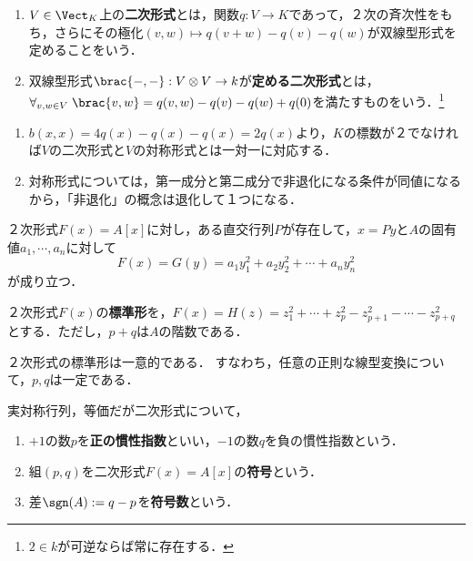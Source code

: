 \documentclass[uplatex, dvipdfmx]{jsreport}
\begin{document}
\begin{definition}\mbox{}
    \begin{enumerate}
        \item $V\in\Vect_K$上の\textbf{二次形式}とは，関数$q:V\to K$であって，２次の斉次性をもち，さらにその極化$(v,w)\mapsto q(v+w)-q(v)-q(w)$が双線型形式を定めることをいう．
        \item 双線型形式$\brac{-,-}:V\otimes V\to k$が\textbf{定める二次形式}とは，$\forall_{v,w\in V}\;\brac{v,w}=q(v,w)-q(v)-q(w)+q(0)$を満たすものをいう．\footnote{$2\in k$が可逆ならば常に存在する．}
    \end{enumerate}
\end{definition}
\begin{remark}[二次形式と双線型形式の一対一対応]\mbox{}
    \begin{enumerate}
        \item $b(x,x)=4q(x)-q(x)-q(x)=2q(x)$より，$K$の標数が２でなければ$V$の二次形式と$V$の対称形式とは一対一に対応する．
        \item 対称形式については，第一成分と第二成分で非退化になる条件が同値になるから，「非退化」の概念は退化して１つになる．
    \end{enumerate}
\end{remark}


\begin{theorem}[対称行列の対角化の二次形式の言葉による消息]
    ２次形式$F(x)=A[x]$に対し，ある直交行列$P$が存在して，$x=Py$と$A$の固有値$a_1,\cdots,a_n$に対して
    \[
        F(x)=G(y)=a_1y_1^2+a_2y_2^2+\cdots+a_ny_n^2
    \]
    が成り立つ．
\end{theorem}

\begin{definition}
    ２次形式$F(x)$の\textbf{標準形}を，$F(x)=H(z)=z_1^2+\cdots+z_p^2-z^2_{p+1}-\cdots-z^2_{p+q}$とする．ただし，$p+q$は$A$の階数である．
\end{definition}

\begin{theorem}
    ２次形式の標準形は一意的である．
    すなわち，任意の正則な線型変換について，$p,q$は一定である．
\end{theorem}

\begin{definition}
    実対称行列，等価だが二次形式について，
    \begin{enumerate}
        \item $+1$の数$p$を\textbf{正の慣性指数}といい，$-1$の数$q$を負の慣性指数という．
        \item 組$(p,q)$を二次形式$F(x)=A[x]$の\textbf{符号}という．
        \item 差$\sgn(A):=q-p$を\textbf{符号数}という．
    \end{enumerate}
\end{definition}
\end{document}
